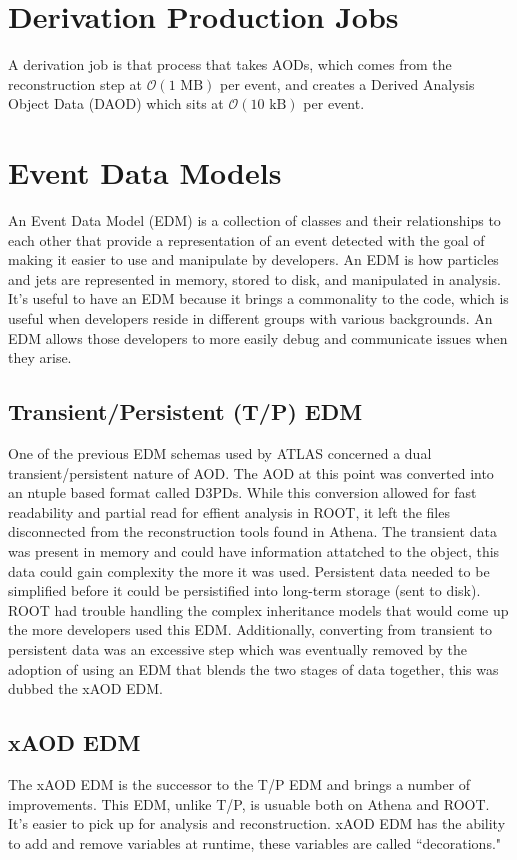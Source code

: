 \section{Derivation Production Jobs}
A derivation job is that process that takes AODs, which comes from the reconstruction step at $\mathcal{O}(1 \text{ MB})$ per event, and creates a Derived Analysis Object Data (DAOD) which sits at $\mathcal{O}(10 \text{ kB})$ per event.


\section{Event Data Models}
An Event Data Model (EDM) is a collection of classes and their relationships to each other that provide a representation of an event detected with the goal of making it easier to use and manipulate by developers.
An EDM is how particles and jets are represented in memory, stored to disk, and manipulated in analysis.
It's useful to have an EDM because it brings a commonality to the code, which is useful when developers reside in different groups with various backgrounds.
An EDM allows those developers to more easily debug and communicate issues when they arise.  

\subsection{Transient/Persistent (T/P) EDM}
One of the previous EDM schemas used by ATLAS concerned a dual transient/persistent nature of AOD.
The AOD at this point was converted into an ntuple based format called D3PDs. 
While this conversion allowed for fast readability and partial read for effient analysis in ROOT, it left the files disconnected from the reconstruction tools found in Athena.\cite{Athena_xAOD_design}
The transient data was present in memory and could have information attatched to the object, this data could gain complexity the more it was used.
Persistent data needed to be simplified before it could be persistified into long-term storage (sent to disk). 
ROOT had trouble handling the complex inheritance models that would come up the more developers used this EDM. 
Additionally, converting from transient to persistent data was an excessive step which was eventually removed by the adoption of using an EDM that blends the two stages of data together, this was dubbed the xAOD EDM.

\subsection{xAOD EDM}
The xAOD EDM is the successor to the T/P EDM and brings a number of improvements.
This EDM, unlike T/P, is usuable both on Athena and ROOT.
It's easier to pick up for analysis and reconstruction. 
xAOD EDM has the ability to add and remove variables at runtime, these variables are called ``decorations."